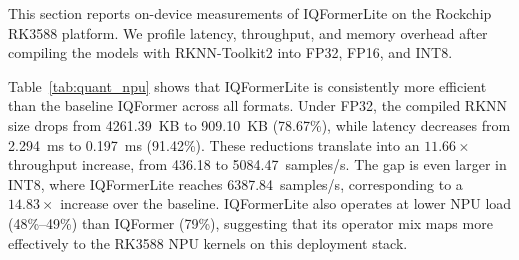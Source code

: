 \documentclass{article}
\begin{document}
	This section reports on-device measurements of IQFormerLite on the Rockchip RK3588 platform. We profile latency, throughput, and memory overhead after compiling the models with RKNN-Toolkit2 into FP32, FP16, and INT8.
	
	Table~\ref{tab:quant_npu} shows that IQFormerLite is consistently more efficient than the baseline IQFormer across all formats. Under FP32, the compiled RKNN size drops from 4261.39~KB to 909.10~KB (78.67\%), while latency decreases from 2.294~ms to 0.197~ms (91.42\%). These reductions translate into an $11.66\times$ throughput increase, from 436.18 to 5084.47~samples/s. The gap is even larger in INT8, where IQFormerLite reaches 6387.84~samples/s, corresponding to a $14.83\times$ increase over the baseline. IQFormerLite also operates at lower NPU load (48\%--49\%) than IQFormer (79\%), suggesting that its operator mix maps more effectively to the RK3588 NPU kernels on this deployment stack.
	
\end{document}

